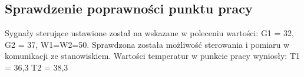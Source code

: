 \subsection{Sprawdzenie poprawności punktu pracy}
\label{lab:zad1}

Sygnały sterujące ustawione został na wskazane w poleceniu wartości:
G1 = 32, G2 = 37, W1=W2=50. Sprawdzona została możliwość sterowania i pomiaru w
komunikacji ze stanowiskiem. Wartości temperatur w punkcie pracy wyniosły:
T1 = 36,3 T2 = 38,3

\newpage
